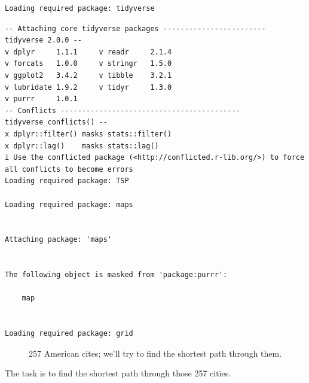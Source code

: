 \documentclass[
  11pt,
  letterpaper,
  DIV=11,
  numbers=noendperiod,
  oneside]{scrartcl}
\begin{document}
\begin{verbatim}
Loading required package: tidyverse
\end{verbatim}

\begin{verbatim}
-- Attaching core tidyverse packages ------------------------ tidyverse 2.0.0 --
v dplyr     1.1.1     v readr     2.1.4
v forcats   1.0.0     v stringr   1.5.0
v ggplot2   3.4.2     v tibble    3.2.1
v lubridate 1.9.2     v tidyr     1.3.0
v purrr     1.0.1     
-- Conflicts ------------------------------------------ tidyverse_conflicts() --
x dplyr::filter() masks stats::filter()
x dplyr::lag()    masks stats::lag()
i Use the conflicted package (<http://conflicted.r-lib.org/>) to force all conflicts to become errors
Loading required package: TSP

Loading required package: maps


Attaching package: 'maps'


The following object is masked from 'package:purrr':

    map


Loading required package: grid
\end{verbatim}

\begin{figure}


\caption{\label{fig-map}257 American cites; we'll try to find the
shortest path through them.}

\end{figure}%

The task is to find the shortest path through those 257
cities.
\end{document}
